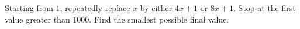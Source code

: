 Starting from $1$, repeatedly replace $x$ by either $4x+1$ or $8x+1$. Stop at the first value greater than $1000$. Find the smallest possible final value.
